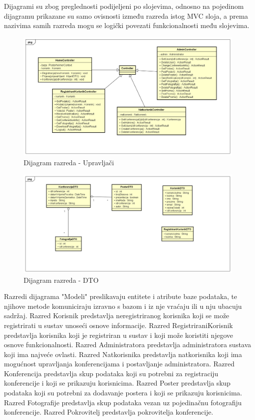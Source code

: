 			Dijagrami su zbog preglednosti podijeljeni po slojevima, odnosno na pojedinom dijagramu prikazane su samo ovisnosti između razreda istog MVC sloja, a prema nazivima samih razreda mogu se logički povezati funkcionalnosti među slojevima.
			
			\begin{figure} [h]
				\includegraphics[width=\linewidth]{Slike/ClassDiagramControllers}
				\caption{Dijagram razreda - Upravljači}
			\end{figure}
			
			\begin{figure} [h]
				\includegraphics[width=\linewidth]{Slike/DarioClassDiagramDTO}
				\caption{Dijagram razreda - DTO}
			\end{figure}
			
			Razredi dijagrama "Modeli" preslikavaju entitete i atribute baze podataka, te njihove metode komuniciraju izravno s bazom i iz nje vraćaju ili u nju ubacuju sadržaj. Razred Korisnik predstavlja neregistriranog korisnika koji se može registrirati u sustav unoseći osnove informacije. Razred RegistriraniKorisnik predstavlja korisnika koji je registriran u sustav i koji može koristiti njegove osnove funkcionalnosti. Razred Administratora predstavlja administratora sustava koji ima najveće ovlasti. Razred Natkorisnika predstavlja natkorisnika koji ima mogućnost upravljanja konferencijama i postavljanje administratora. Razred Konferencija predstavlja skup podataka koji su potrebni za registraciju konferencije i koji se prikazuju korisnicima. Razred Poster predstavlja skup podataka koji su potrebni za dodavanje postera i koji se prikazuju korisnicima. Razred Fotografije predstavlja skup podataka vezan uz pojedinačnu fotografiju konferencije. Razred Pokrovitelj predstavlja pokrovitelja konferencije. 
			
